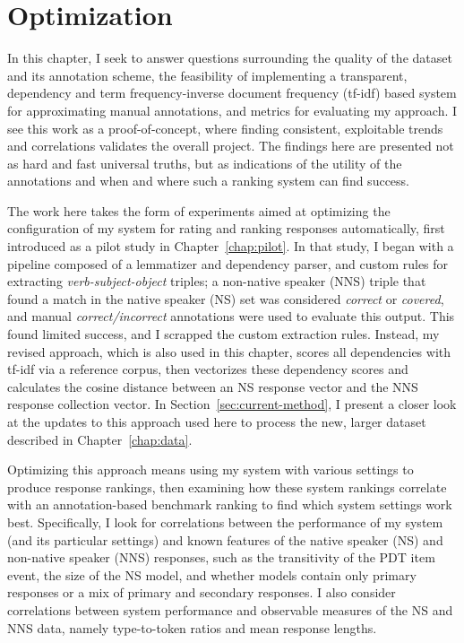 \chapter{Optimization}
\label{chap:optimization}

In this chapter, I seek to answer questions surrounding the quality of the dataset and its annotation scheme, the feasibility of implementing a transparent, dependency and term frequency-inverse document frequency (tf-idf) based system for approximating manual annotations, and metrics for evaluating my approach. I see this work as a proof-of-concept, where finding consistent, exploitable trends and correlations validates the overall project. The findings here are presented not as hard and fast universal truths, but as indications of the utility of the annotations  and when and where such a ranking system can find success.

The work here takes the form of experiments aimed at optimizing the configuration of my system for rating and ranking responses automatically, first introduced as a pilot study in Chapter~\ref{chap:pilot}. In that study, I began with a pipeline composed of a lemmatizer and dependency parser, and custom rules for extracting \textit{verb-subject-object} triples; a non-native speaker (NNS) triple that found a match in the native speaker (NS) set was considered \textit{correct} or \textit{covered}, and manual \textit{correct/incorrect} annotations were used to evaluate this output. This found limited success, and I scrapped the custom extraction rules. Instead, my revised approach, which is also used in this chapter, scores all dependencies with tf-idf via a reference corpus, then vectorizes these dependency scores and calculates the cosine distance between an NS response vector and the NNS response collection vector. In Section~\ref{sec:current-method}, I present a closer look at the updates to this approach used here to process the new, larger dataset described in Chapter~\ref{chap:data}.

Optimizing this approach means using my system with various settings to produce response rankings, then examining how these system rankings correlate with an annotation-based benchmark ranking to find which system settings work best. Specifically, I look for correlations between the performance of my system (and its particular settings) and known features of the native speaker (NS) and non-native speaker (NNS) responses, such as the transitivity of the PDT item event, the size of the NS model, and whether models contain only primary responses or a mix of primary and secondary responses. I also consider correlations between system performance and observable measures of the NS and NNS data, namely type-to-token ratios and mean response lengths.

